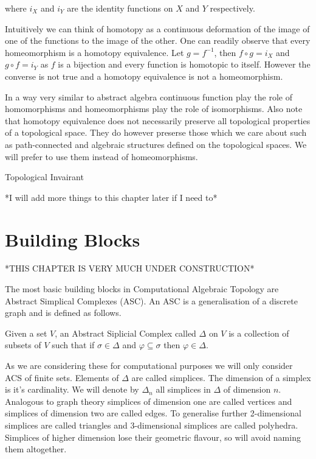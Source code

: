 where $i_X$ and $i_Y$ are the identity functions on $X$ and $Y$ respectively.

Intuitively we can think of homotopy as a continuous deformation of the image of one of the functions to the image of the other. One can readily observe that every homeomorphism is a homotopy equivalence. Let $g = f^{-1}$, then $f \circ g = i_X$ and $g \circ f = i_Y$ as $f$ is a bijection and every function is homotopic to itself. However the converse is not true and a homotopy equivalence is not a homeomorphism.

In a way very similar to abstract algebra continuous function play the role of homomorphisms and homeomorphisms play the role of isomorphisms. Also note that homotopy equivalence does not necessarily preserve all topological properties of a topological space. They do however preserse those which we care about such as path-connected and algebraic structures defined on the topological spaces. We will prefer to use them instead of homeomorphisms. 


\begin{defn}{Topological Invairant}   \end{defn}

*I will add more things to this chapter later if I need to*


\section{Building Blocks}

*THIS CHAPTER IS VERY MUCH UNDER CONSTRUCTION*

The most basic building blocks in Computational Algebraic Topology are Abstract Simplical Complexes (ASC). An ASC is a generalisation of a discrete graph and is defined as follows.


\begin{defn} Given a set $V$, an Abstract Siplicial Complex called $\Delta$ on $V$ is a collection of subsets of $V$ such that if $\sigma \in \Delta$ and $\varphi \subseteq \sigma$ then $\varphi \in \Delta$.  \end{defn}

As we are considering these for computational purposes we will only consider ACS of finite sets. Elements of $\Delta$ are called simplices. The dimension of a simplex is it's cardinality. We will denote by $\Delta_n$ all simplices in $\Delta$ of dimension $n$. Analogous to graph theory simplices of dimension one are called vertices and simplices of dimension two are called edges. To generalise further 2-dimensional simplices are called triangles and 3-dimensional simplices are called polyhedra. Simplices of higher dimension lose their geometric flavour, so will avoid naming them altogether.

